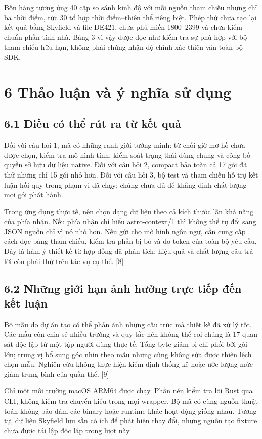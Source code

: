 \documentclass[11pt,a4paper]{article}
\begin{document}
Bốn hàng tương ứng 40 cặp so sánh kinh độ với mỗi nguồn tham chiếu nhưng chỉ ba thời điểm, tức 30 tổ hợp thời điểm–thiên thể riêng biệt. Phép thử chưa tạo lại kết quả bằng Skyfield và file DE421, chưa phủ miền 1800–2399 và chưa kiểm chuẩn phần tính nhà. Bảng 3 vì vậy được đọc như kiểm tra sự phù hợp với bộ tham chiếu hữu hạn, không phải chứng nhận độ chính xác thiên văn toàn bộ SDK.


\section*{6 Thảo luận và ý nghĩa sử dụng}
\subsection*{6.1 Điều có thể rút ra từ kết quả}
Đối với câu hỏi 1, mã có những ranh giới tường minh: từ chối giờ mơ hồ chưa được chọn, kiểm tra mô hình tính, kiểm soát trạng thái dùng chung và công bố quyền sở hữu dữ liệu native. Đối với câu hỏi 2, compact bảo toàn cả 17 gói đã thử nhưng chỉ 15 gói nhỏ hơn. Đối với câu hỏi 3, bộ test và tham chiếu hỗ trợ kết luận hồi quy trong phạm vi đã chạy; chúng chưa đủ để khẳng định chất lượng mọi gói phát hành.


Trong ứng dụng thực tế, nên chọn dạng dữ liệu theo cả kích thước lẫn khả năng của phía nhận. Nếu phía nhận chỉ hiểu astro-context/\allowbreak{}1 thì không thể tự đổi sang JSON nguồn chỉ vì nó nhỏ hơn. Nếu gửi cho mô hình ngôn ngữ, cần cung cấp cách đọc bảng tham chiếu, kiểm tra phần bị bỏ và đo token của toàn bộ yêu cầu. Đây là hàm ý thiết kế từ hợp đồng đã phân tích; hiệu quả và chất lượng câu trả lời còn phải thử trên tác vụ cụ thể. [8]


\subsection*{6.2 Những giới hạn ảnh hưởng trực tiếp đến kết luận}
Bộ mẫu do dự án tạo có thể phản ánh những cấu trúc mà thiết kế đã xử lý tốt. Các mẫu còn chia sẻ nhiều trường và quy tắc nên không thể coi chúng là 17 quan sát độc lập từ một tập người dùng thực tế. Tổng byte giảm bị chi phối bởi gói lớn; trung vị bổ sung góc nhìn theo mẫu nhưng cũng không sửa được thiên lệch chọn mẫu. Nghiên cứu không thực hiện kiểm định thống kê hoặc ước lượng mức giảm trung bình của quần thể. [9]


Chỉ một môi trường macOS ARM64 được chạy. Phần nén kiểm tra lõi Rust qua CLI, không kiểm tra chuyển kiểu trong mọi wrapper. Bộ mã có cùng nguồn thuật toán không bảo đảm các binary hoặc runtime khác hoạt động giống nhau. Tương tự, dữ liệu Skyfield lưu sẵn có ích để phát hiện thay đổi, nhưng nguồn tạo fixture chưa được tái lập độc lập trong lượt này.
\end{document}
